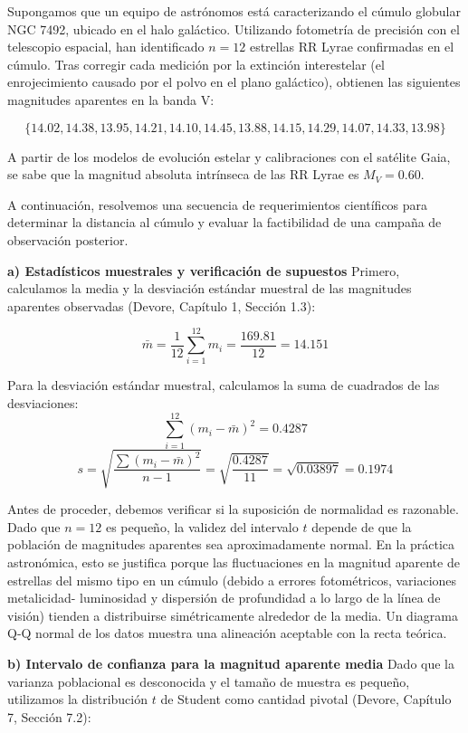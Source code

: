 Supongamos que un equipo de astrónomos está caracterizando el cúmulo globular NGC 7492, ubicado en el halo galáctico. Utilizando fotometría de precisión con el telescopio espacial, han identificado $n = 12$ estrellas RR Lyrae confirmadas en el cúmulo. Tras corregir cada medición por la extinción interestelar (el enrojecimiento causado por el polvo en el plano galáctico), obtienen las siguientes magnitudes aparentes en la banda V:

$$ \{14.02, 14.38, 13.95, 14.21, 14.10, 14.45, 13.88, 14.15, 14.29, 14.07, 14.33, 13.98\} $$

A partir de los modelos de evolución estelar y calibraciones con el satélite Gaia, se sabe que la magnitud absoluta intrínseca de las RR Lyrae es $M_V = 0.60$.

A continuación, resolvemos una secuencia de requerimientos científicos para determinar la distancia al cúmulo y evaluar la factibilidad de una campaña de observación posterior.

\textbf{a) Estadísticos muestrales y verificación de supuestos}
Primero, calculamos la media y la desviación estándar muestral de las magnitudes aparentes observadas (Devore, Capítulo 1, Sección 1.3):

$$ \bar{m} = \frac{1}{12} \sum_{i=1}^{12} m_i = \frac{169.81}{12} = 14.151 $$

Para la desviación estándar muestral, calculamos la suma de cuadrados de las desviaciones:
$$ \sum_{i=1}^{12} (m_i - \bar{m})^2 = 0.4287 $$
$$ s = \sqrt{\frac{\sum (m_i - \bar{m})^2}{n-1}} = \sqrt{\frac{0.4287}{11}} = \sqrt{0.03897} = 0.1974 $$

Antes de proceder, debemos verificar si la suposición de normalidad es razonable. Dado que $n = 12$ es pequeño, la validez del intervalo $t$ depende de que la población de magnitudes aparentes sea aproximadamente normal. En la práctica astronómica, esto se justifica porque las fluctuaciones en la magnitud aparente de estrellas del mismo tipo en un cúmulo (debido a errores fotométricos, variaciones metalicidad- luminosidad y dispersión de profundidad a lo largo de la línea de visión) tienden a distribuirse simétricamente alrededor de la media. Un diagrama Q-Q normal de los datos muestra una alineación aceptable con la recta teórica.

\textbf{b) Intervalo de confianza para la magnitud aparente media}
Dado que la varianza poblacional es desconocida y el tamaño de muestra es pequeño, utilizamos la distribución $t$ de Student como cantidad pivotal (Devore, Capítulo 7, Sección 7.2):


